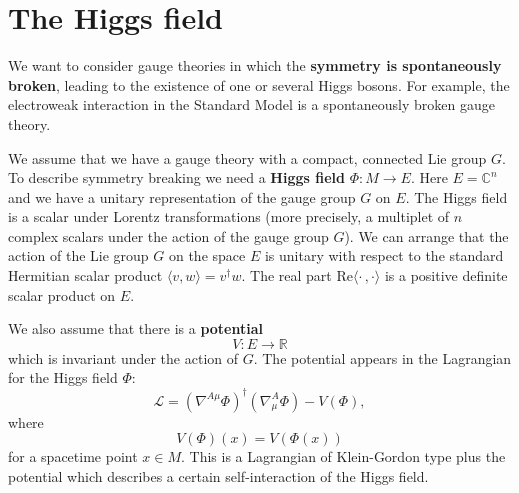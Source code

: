 \documentclass[11pt]{amsart}
\theoremstyle{definition}
\theoremstyle{remark}
\numberwithin{equation}{section}
\begin{document}
\section{The Higgs field}\label{sect higgs field}
We want to consider gauge theories in which the {\bf symmetry is spontaneously broken}, leading to the existence of one or several Higgs bosons. For example, the electroweak interaction in the Standard Model is a spontaneously broken gauge theory.

We assume that we have a gauge theory with a compact, connected Lie group $G$. To describe symmetry breaking we need a {\bf Higgs field} $\Phi\colon M\rightarrow E$. Here $E=\mathbb{C}^n$ and we have a unitary representation of the gauge group $G$ on $E$. The Higgs field is a scalar under Lorentz transformations (more precisely, a multiplet of $n$ complex scalars under the action of the gauge group $G$). We can arrange that the action of the Lie group $G$ on the space $E$ is unitary with respect to the standard Hermitian scalar product $\langle v,w\rangle=v^\dagger w$. The real part $\mathrm{Re}\langle\cdot\,,\cdot\rangle$ is a positive definite scalar product on $E$. 

We also assume that there is a {\bf potential} 
\begin{equation*}
V\colon E\longrightarrow\mathbb{R}
\end{equation*}
which is invariant under the action of $G$. The potential appears in the Lagrangian for the Higgs field $\Phi$:
\begin{equation*}
\mathcal{L}=\left(\nabla^{A\mu}\Phi\right)^\dagger\left(\nabla^{A}_\mu\Phi\right)-V(\Phi),
\end{equation*}
where 
\begin{equation*}
V(\Phi)(x)=V(\Phi(x))
\end{equation*}
for a spacetime point $x\in M$. This is a Lagrangian of Klein-Gordon type plus the potential which describes a certain self-interaction of the Higgs field.
\end{document}
